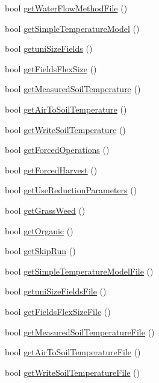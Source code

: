 \begin{DoxyCompactItemize}
\item 
bool \hyperlink{classsystem_data_a582591f8293cb92271d780bc650bd90f}{getWaterFlowMethodFile} ()
\item 
bool \hyperlink{classsystem_data_a0b9a9e27ee0e775356ef2294638643bf}{getSimpleTemperatureModel} ()
\item 
bool \hyperlink{classsystem_data_ab8e1bdd90f8dbb88357b6dec24249731}{getuniSizeFields} ()
\item 
bool \hyperlink{classsystem_data_af245b48be084cecebd23f9fdd2c8987a}{getFieldsFlexSize} ()
\item 
bool \hyperlink{classsystem_data_a878fe76bb28df8e163d5e6d873610f7c}{getMeasuredSoilTemperature} ()
\item 
bool \hyperlink{classsystem_data_a3d7d275e0efd7eeb40b2d68242076cc9}{getAirToSoilTemperature} ()
\item 
bool \hyperlink{classsystem_data_af8606677a7d05243c0d0fd9494575a50}{getWriteSoilTemperature} ()
\item 
bool \hyperlink{classsystem_data_a637e6cc700d75d977037575dc6b17960}{getForcedOperations} ()
\item 
bool \hyperlink{classsystem_data_a55e92517ec2726f93006959dc7bc1d3c}{getForcedHarvest} ()
\item 
bool \hyperlink{classsystem_data_a2f603943b69b5d8abf08f590889c1bcf}{getUseReductionParameters} ()
\item 
bool \hyperlink{classsystem_data_afbebb08c2a7d7dff73524be476b97869}{getGrassWeed} ()
\item 
bool \hyperlink{classsystem_data_a5b126f14116e9ac9b9729d227eb43b48}{getOrganic} ()
\item 
bool \hyperlink{classsystem_data_ab2ee421cbcabb94e406b22ba6fc9cf31}{getSkipRun} ()
\item 
bool \hyperlink{classsystem_data_a47fe15123ee859bc3d1ec1a8408a5381}{getSimpleTemperatureModelFile} ()
\item 
bool \hyperlink{classsystem_data_a261459c5332521a7f47e2bf1c8a813af}{getuniSizeFieldsFile} ()
\item 
bool \hyperlink{classsystem_data_ae8e761fed2b276acbfdf54f0680bf3cb}{getFieldsFlexSizeFile} ()
\item 
bool \hyperlink{classsystem_data_a95042b0026d6da85872e5a57ab620da3}{getMeasuredSoilTemperatureFile} ()
\item 
bool \hyperlink{classsystem_data_ae716c1a9cd60b6c662833c98882d9bf3}{getAirToSoilTemperatureFile} ()
\item 
bool \hyperlink{classsystem_data_aa5de73e3b5bbde326f30f19e2a21aa82}{getWriteSoilTemperatureFile} ()

\end{DoxyCompactItemize}
